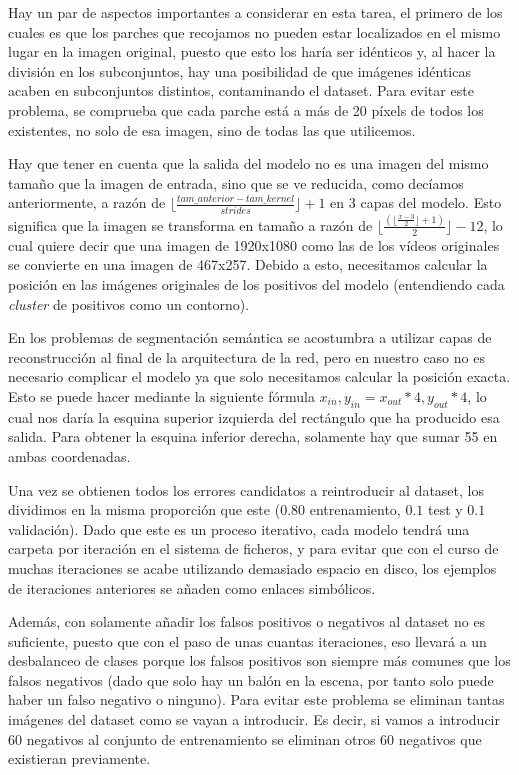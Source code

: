 Hay un par de aspectos importantes a considerar en esta tarea, el primero de los cuales es que los parches que recojamos no pueden estar localizados en el mismo lugar en la imagen original, puesto que esto los haría ser idénticos y, al hacer la división en los subconjuntos, hay una posibilidad de que imágenes idénticas acaben en subconjuntos distintos, contaminando el dataset. Para evitar este problema, se comprueba que cada parche está a más de 20 píxels de todos los existentes, no solo de esa imagen, sino de todas las que utilicemos.

Hay que tener en cuenta que la salida del modelo no es una imagen del mismo tamaño que la imagen de entrada, sino que se ve reducida, como decíamos anteriormente, a razón de $\lfloor\frac{tam\_anterior - tam\_kernel}{strides}\rfloor+1$ en 3 capas del modelo. Esto significa que la imagen se transforma en tamaño a razón de $\lfloor\frac{(\lfloor\frac{x-3}{2}\rfloor + 1)}{2}\rfloor-12$, lo cual quiere decir que una imagen de 1920x1080 como las de los vídeos originales se convierte en una imagen de 467x257. Debido a esto, necesitamos calcular la posición en las imágenes originales de los positivos del modelo (entendiendo cada \textit{cluster} de positivos como un contorno). 

En los problemas de segmentación semántica se acostumbra a utilizar capas de reconstrucción al final de la arquitectura de la red, pero en nuestro caso no es necesario complicar el modelo ya que solo necesitamos calcular la posición exacta. Esto se puede hacer mediante la siguiente fórmula $x_{in},y_{in} = x_{out} * 4, y_{out} * 4$, lo cual nos daría la esquina superior izquierda del rectángulo que ha producido esa salida. Para obtener la esquina inferior derecha, solamente hay que sumar 55 en ambas coordenadas.

Una vez se obtienen todos los errores candidatos a reintroducir al dataset, los dividimos en la misma proporción que este ($0.80$ entrenamiento, $0.1$ test y $0.1$ validación). Dado que este es un proceso iterativo, cada modelo tendrá una carpeta por iteración en el sistema de ficheros, y para evitar que con el curso de muchas iteraciones se acabe utilizando demasiado espacio en disco, los ejemplos de iteraciones anteriores se añaden como enlaces simbólicos.

Además, con solamente añadir los falsos positivos o negativos al dataset no es suficiente, puesto que con el paso de unas cuantas iteraciones, eso llevará a un desbalanceo de clases porque los falsos positivos son siempre más comunes que los falsos negativos (dado que solo hay un balón en la escena, por tanto solo puede haber un falso negativo o ninguno). Para evitar este problema se eliminan tantas imágenes del dataset como se vayan a introducir. Es decir, si vamos a introducir 60 negativos al conjunto de entrenamiento se eliminan otros 60 negativos que existieran previamente.

